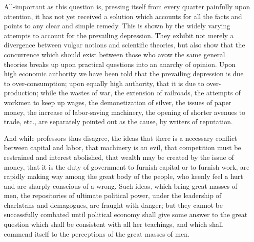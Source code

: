All-important as this question is, pressing itself from every quarter
painfully upon attention, it has not yet received a solution which
accounts for all the facts and points to any clear and simple remedy.
This is shown by the widely varying attempts to account for the
prevailing depression. They exhibit not merely a divergence between
vulgar notions and scientific theories, but also show that the
concurrence which should exist between those who avow the same general
theories breaks up upon practical questions into an anarchy of opinion.
Upon high economic authority we have been told that the prevailing
depression is due to over-consumption; upon equally high authority, that
it is due to over-production; while the wastes of war, the extension of
railroads, the attempts of workmen to keep up wages, the demonetization
of silver, the issues of paper money, the increase of labor-saving
machinery, the opening of shorter avenues to trade, etc., are separately
pointed out as the cause, by writers of reputation.

And while professors thus disagree, the ideas that there is a necessary
conflict between capital and labor, that machinery is an evil, that
competition must be restrained and interest abolished, that wealth may
be created by the issue of money, that it is the duty of government to
furnish capital or to furnish work, are rapidly making way among the
great body of the people, who keenly feel a hurt and are sharply
conscious of a wrong. Such ideas, which bring great masses of men, the
repositories of ultimate political power, under the leadership of
charlatans and demagogues, are fraught with danger; but they cannot be
successfully combated until political economy shall give some answer to
the great question which shall be consistent with all her teachings, and
which shall commend itself to the perceptions of the great masses of
men.

